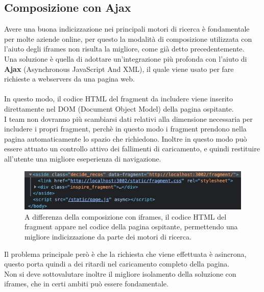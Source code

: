 \subsection{Composizione con Ajax}
Avere una buona indicizzazione nei principali motori di ricerca è fondamentale per molte aziende online, per questo la modalità di 
composizione utilizzata con l'aiuto degli iframes non risulta la migliore, come già detto precedentemente.
\\Una soluzione è quella di adottare un'integrazione più profonda con l'aiuto di \textbf{Ajax} (Asynchronous JavaScript And XML),
il quale viene usato per fare richieste a webservers da una pagina web.
\\\\
In questo modo, il codice HTML del fragment da includere viene inserito direttamente nel DOM (Document Object Model) della pagina ospitante.
\\
I team non dovranno più scambiarsi dati relativi alla dimensione necessaria per includere i propri fragment, perchè in questo modo
i fragment prendono nella pagina automaticamente lo spazio che richiedono. Inoltre in questo modo può essere attuato un controllo attivo 
dei fallimenti di caricamento, e quindi restituire all'utente una migliore eseperienza di navigazione.
\begin{figure}[H]
    \centering
    \includegraphics[width=140mm]{img/ajax}
    \caption{A differenza della composizione con iframes, il codice HTML del fragment appare nel codice della pagina ospitante, permettendo una migliore
    indicizzazione da parte dei motori di ricerca.}
  \end{figure}

Il problema principale però è che la richiesta che viene effettuata è asincrona, questo porta quindi a dei ritardi nel caricamento completo della pagina.
\\
Non si deve sottovalutare inoltre il migliore isolamento della soluzione con iframes, che in certi ambiti può essere fondamentale.

